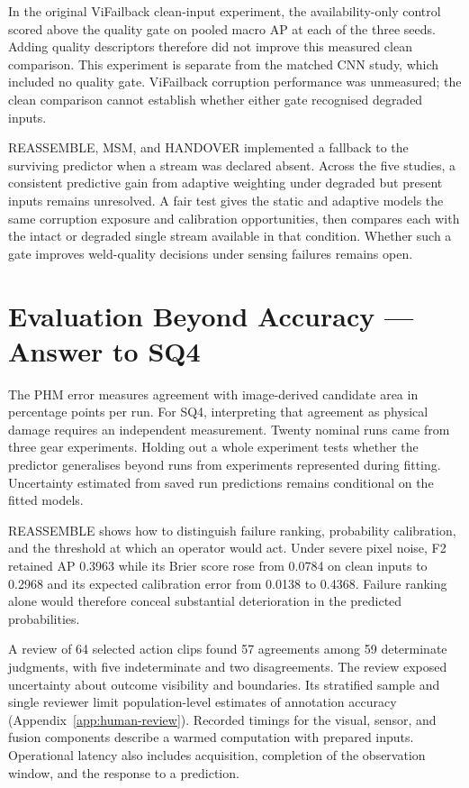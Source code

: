 In the original ViFailback clean-input experiment, the availability-only control scored
above the quality gate on pooled macro AP at each of the three seeds. Adding quality
descriptors therefore did not improve this measured clean comparison. This experiment
is separate from the matched CNN study, which included no quality gate. ViFailback
corruption performance was unmeasured; the clean comparison cannot establish whether
either gate recognised degraded inputs.

REASSEMBLE, MSM, and HANDOVER implemented a fallback to the surviving predictor when a
stream was declared absent. Across the five studies, a consistent predictive gain from
adaptive weighting under degraded but present inputs remains unresolved. A fair test
gives the static and adaptive models the same corruption exposure and calibration
opportunities, then compares each with the intact or degraded single stream available in
that condition. Whether such a gate improves weld-quality decisions under sensing
failures remains open.

\section{Evaluation Beyond Accuracy --- Answer to SQ4}
The PHM error measures agreement with image-derived candidate area in percentage points
per run. For SQ4, interpreting that agreement as physical damage requires an independent
measurement. Twenty nominal runs came from three gear experiments. Holding out a whole
experiment tests whether the predictor generalises beyond runs from experiments
represented during fitting. Uncertainty estimated from saved run predictions remains
conditional on the fitted models.

REASSEMBLE shows how to distinguish failure ranking, probability calibration, and the
threshold at which an operator would act. Under severe pixel noise, F2 retained AP 0.3963
while its Brier score rose from 0.0784 on clean inputs to 0.2968 and its expected
calibration error from 0.0138 to 0.4368. Failure ranking alone would therefore conceal
substantial deterioration in the predicted probabilities.

A review of 64 selected action clips found
57 agreements among 59 determinate judgments, with five indeterminate and two
disagreements. The review exposed uncertainty about outcome visibility and boundaries.
Its stratified sample and single reviewer limit population-level estimates of annotation
accuracy (Appendix~\ref{app:human-review}). Recorded timings for the visual, sensor, and
fusion components describe a warmed computation with prepared inputs. Operational
latency also includes acquisition, completion of the observation window, and the
response to a prediction.

